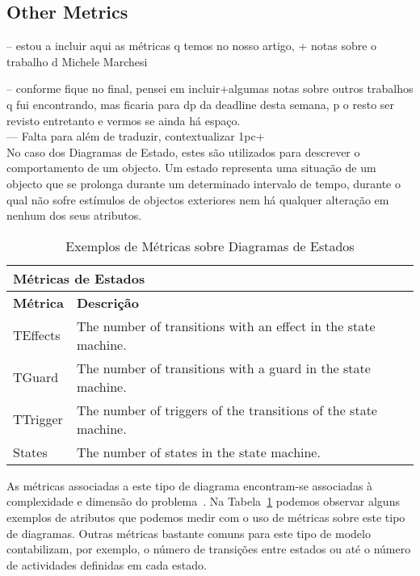 \subsection{Other Metrics}

-- estou a incluir aqui as métricas q temos no nosso artigo, + notas sobre o trabalho d Michele Marchesi

-- conforme fique no final, pensei em incluir+algumas notas sobre outros trabalhos q fui encontrando, mas ficaria para dp da deadline desta semana, p o resto ser revisto entretanto e vermos se ainda há espaço. \\

--- Falta para além de traduzir, contextualizar 1pc+\\


No caso dos Diagramas de Estado, estes são utilizados para descrever o comportamento de um objecto. 
Um estado representa uma situação de um objecto que se prolonga durante um determinado intervalo de tempo, durante o qual não sofre estímulos de objectos exteriores nem há qualquer alteração em nenhum dos seus atributos.

\begin{center}
\begin{table}[h]
\begin{tabular}{ p{2cm} | p{}}
\multicolumn{2}{l}{\textbf{Métricas de Estados}} \\ \hline
\textbf{Métrica}  & \textbf{Descrição} \\ \hline
TEffects  & The number of transitions with an effect in the state machine. \\ \hline 
TGuard & The number of transitions with a guard in the state machine. \\ \hline 
TTrigger & The number of triggers of the transitions of the state machine. \\ \hline 
States & The number of states in the state machine. \\ \hline 
\end{tabular}
\caption{\small{Exemplos de Métricas sobre Diagramas de Estados}}
\label{t:estado}
\end{table}
\end{center}

As métricas associadas a este tipo de diagrama encontram-se associadas à complexidade e dimensão do problema~\cite{EVMmdm}.
Na Tabela~\ref{t:estado} podemos observar alguns exemplos de atributos que podemos medir com o uso de métricas sobre este tipo de diagramas.
Outras métricas bastante comuns para este tipo de modelo contabilizam, por exemplo, o número de transições entre estados ou até o número de actividades definidas em cada estado.

